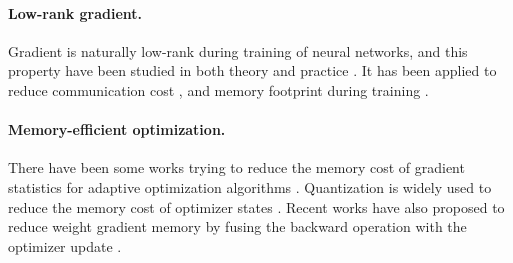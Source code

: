 \paragraph{Low-rank gradient.}
Gradient is naturally low-rank during training of neural networks, and this property have been studied in both theory and practice \citep{zhaoZerOInitializationInitializing2022,cossonLowRankGradientDescent2023,yang2023spectral}.
It has been applied to reduce communication cost \citep{wangATOMOCommunicationefficientLearning,vogelsPowerGossipPracticalLowRank2020}, and memory footprint during training \citep{gooneratneLowrankGradientApproximation2020,huangLowRankGradientDescent2023,modoranuErrorFeedbackCan2024}.

\paragraph{Memory-efficient optimization.}
There have been some works trying to reduce the memory cost of gradient statistics for adaptive optimization algorithms \citep{shazeerAdafactorAdaptiveLearning,anilMemoryEfficientAdaptive,dettmers8bitOptimizersBlockwise2021}. 
Quantization is widely used to reduce the memory cost of optimizer states \citep{dettmers8bitOptimizersBlockwise2021,liMemoryEfficientOptimizers2023}.
Recent works have also proposed to reduce weight gradient memory by fusing the backward operation with the optimizer update \citep{lvAdaLomoLowmemoryOptimization2023,lvFullParameterFinetuning2023}.


